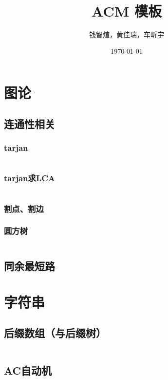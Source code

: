 \documentclass[12pt, a4paper, oneside]{ctexart}
\title{ACM 模板}
\author{钱智煊，黄佳瑞，车昕宇}
\date{\today}
\begin{document}
    \scriptsize
    \maketitle
    \newpage
    
    \begin{multicols}{2}
        \tableofcontents
        \newpage

        \section{图论}
        \subsection{连通性相关}
        \subsubsection{tarjan}
        \inputminted{cpp}{src/graph/tarjan.cpp}
        \subsubsection{tarjan求LCA}
        
        \inputminted{cpp}{src/graph/tarjan_lca.cpp}
        \subsubsection{割点、割边}
        
        \subsubsection{圆方树}
        
        \inputminted{cpp}{src/graph/圆方树.cpp}
        \subsection{同余最短路}
        

        \section{字符串}
        \subsection{后缀数组（与后缀树）}
        \inputminted{cpp}{src/string/SA.cpp}
        \subsection{AC自动机}
        \inputminted{cpp}{src/string/ACAM.cpp}

\end{multicols}
\end{document}
